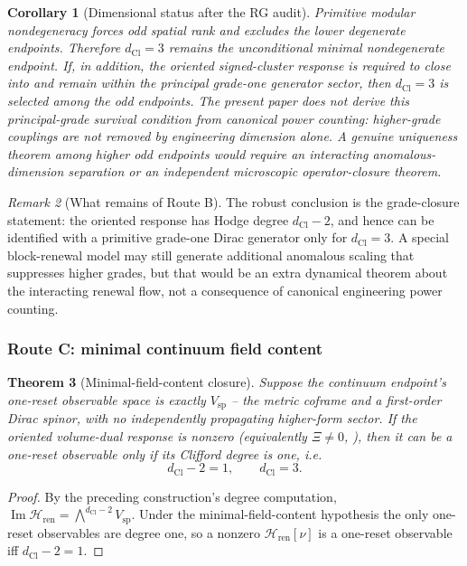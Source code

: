 \documentclass[11pt]{article}
\newtheorem{theorem}{Theorem}[section]
\newtheorem{corollary}[theorem]{Corollary}
\theoremstyle{definition}
\theoremstyle{remark}
\newtheorem{remark}[theorem]{Remark}
\newcommand{\dCl}{d_{\mathrm{Cl}}}
\newcommand{\Vsp}{V_{\mathrm{sp}}}
\newcommand{\Img}{\operatorname{Im}}
\newcommand{\Hren}{\mathcal{H}_{\mathrm{ren}}}
\begin{document}
\begin{corollary}[Dimensional status after the RG audit]
\label{cor:dimension-status-rg-audit}
Primitive modular nondegeneracy forces odd spatial rank and excludes the lower
degenerate endpoints.  Therefore \(\dCl=3\) remains the unconditional minimal
nondegenerate endpoint.  If, in addition, the oriented signed-cluster response
is required to close into and remain within the principal grade-one generator
sector, then \(\dCl=3\) is selected among the odd endpoints.  The present paper
does not derive this principal-grade survival condition from canonical power
counting: higher-grade couplings are not removed by engineering dimension
alone.  A genuine uniqueness theorem among higher odd endpoints would require
an interacting anomalous-dimension separation or an independent microscopic
operator-closure theorem.
\end{corollary}

\begin{remark}[What remains of Route B]
\label{rem:route-B-after-rg-audit}
The robust conclusion is the grade-closure statement:  the oriented response has Hodge degree
\(\dCl-2\), and hence can be identified with a primitive grade-one Dirac
generator only for \(\dCl=3\).  A special block-renewal model may still generate
additional anomalous scaling that suppresses higher grades, but that would be an
extra dynamical theorem about the interacting renewal flow, not a consequence of
canonical engineering power counting.
\end{remark}

\subsubsection{Route C: minimal continuum field content}

\begin{theorem}[Minimal-field-content closure]
\label{thm:minimal-field}
Suppose the continuum endpoint's one-reset observable space is
exactly $\Vsp$ -- the metric coframe and a first-order Dirac spinor, with no
independently propagating higher-form sector.  If the oriented volume-dual
response is nonzero \textup{(}equivalently $\Xi\neq0$, \textup{)},
then it can be a one-reset observable only if its Clifford degree is one, i.e.
\[
  \dCl-2=1,\qquad \boxed{\dCl=3}.
\]
\end{theorem}

\begin{proof}
By the preceding construction's degree computation, $\Img\Hren=\bigwedge^{\dCl-2}
\Vsp$.  Under the minimal-field-content hypothesis the only one-reset observables
are degree one, so a nonzero $\Hren[\nu]$ is a one-reset observable iff $\dCl-2=1$.
\end{proof}
\end{document}
